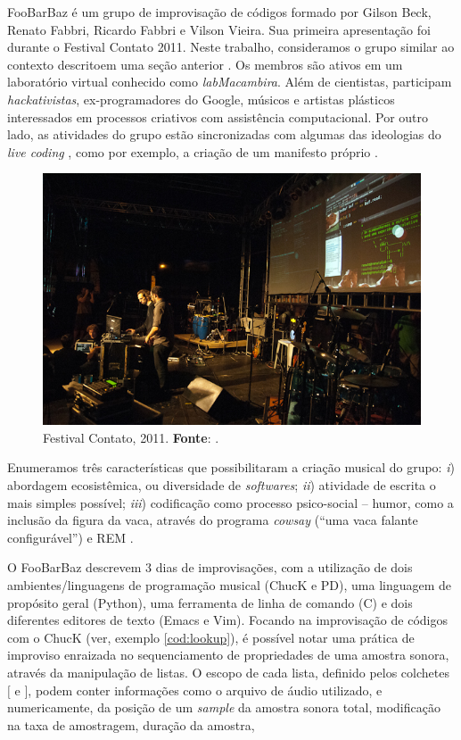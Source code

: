 FooBarBaz é um grupo de improvisação de códigos formado por Gilson Beck, Renato Fabbri, Ricardo Fabbri e Vilson Vieira. Sua primeira apresentação foi durante o Festival Contato 2011. Neste trabalho, consideramos o grupo similar ao contexto descritoem uma seção anterior . Os membros são ativos em um laboratório virtual conhecido como \emph{labMacambira}. Além de cientistas, participam \emph{hackativistas}, ex-programadores do Google, músicos e artistas plásticos interessados em processos criativos com assistência computacional. Por outro lado, as atividades do grupo estão sincronizadas com algumas das ideologias do \emph{live coding} , como por exemplo, a criação de um manifesto próprio \cite{vieira_vivace:_2015}.
 
\begin{figure}[!h]
  \centering
  \includegraphics[scale=0.71]{imagens/Foobarbaz1.jpg}
  \caption{Festival Contato, 2011. \textbf{Fonte}: .}
  \label{fig:foobarbaz}
\end{figure}

Enumeramos três características que possibilitaram a criação musical do grupo: \emph{i}) abordagem ecosistêmica, ou diversidade de \emph{softwares}; \emph{ii}) atividade de escrita o mais simples possível; \emph{iii}) codificação como processo psico-social -- humor, como a inclusão da figura da vaca, através do programa \emph{cowsay} (``uma vaca falante configurável'')  e REM . 

O FooBarBaz descrevem 3 dias de improvisações, com a utilização de dois ambientes/linguagens de programação musical (ChucK e PD), uma linguagem de propósito geral (Python), uma ferramenta de linha de comando (C) e dois diferentes editores de texto (Emacs e Vim). Focando na improvisação de códigos com o ChucK (ver, exemplo \ref{cod:lookup}), é possível notar uma prática de improviso enraizada no sequenciamento de propriedades de uma amostra sonora, através da manipulação de listas. O escopo de cada lista, definido pelos colchetes $[$ e $]$, podem conter informações como o arquivo de áudio utilizado, e numericamente, da posição de um \emph{sample} da amostra sonora total, modificação na taxa de amostragem, duração da amostra, 

